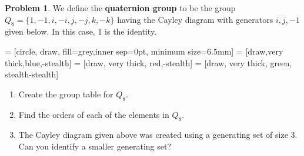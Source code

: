 \documentclass[11pt]{scrartcl}
\theoremstyle{definition}
\newtheorem{problem}[theorem]{Problem}
\begin{document}
\begin{problem}
We define the \textbf{quaternion group} to be the group $Q_8=\{1,-1,i,-i,j,-j,k,-k\}$ having the Cayley diagram with generators $i, j, -1$ given below.  In this case, 1 is the identity.

 = [circle, draw, fill=grey,inner sep=0pt, minimum size=6.5mm]
 = [draw,very thick,blue,-stealth]
 = [draw, very thick, red,-stealth]
 = [draw, very thick, green, stealth-stealth]

\begin{center}
\end{center}
\begin{enumerate}[label=\rm{(\alph*)}]
\item Create the group table for $Q_8$.
\item Find the orders of each of the elements in $Q_8$.
\item The Cayley diagram given above was created using a generating set of size 3.  Can you identify a smaller generating set?
\end{enumerate}
\end{problem}
\end{document}
